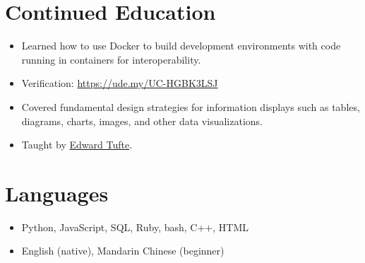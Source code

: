 \documentclass{cultvoucher}
\begin{document}
\section{Continued Education}
\begin{itemize}
	\item Learned how to use Docker to build development environments with code running in containers for interoperability.
	\item Verification: \url{https://ude.my/UC-HGBK3LSJ}
\end{itemize}
\begin{itemize}
	\item Covered fundamental design strategies for information displays such as tables, diagrams, charts, images, and other data visualizations.
	\item Taught by \href{https://www.edwardtufte.com/tufte/}{Edward Tufte}.
\end{itemize}

\section{Languages}
\begin{itemize}
	\item Python, JavaScript, SQL, Ruby, bash, C++, HTML
	\item English (native), Mandarin Chinese (beginner)
\end{itemize}
\end{document}
